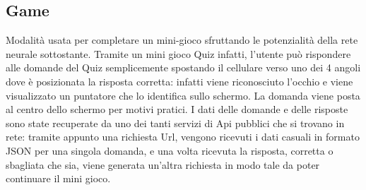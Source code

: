 \documentclass[11pt]{article}
\begin{document}
\newpage
\subsection{Game}
\label{sub:game}
Modalità usata per completare un mini-gioco sfruttando le potenzialità della rete neurale sottostante. Tramite un mini gioco Quiz infatti, l'utente può rispondere alle domande del Quiz semplicemente spostando il cellulare verso uno dei 4 angoli dove è posizionata la risposta corretta: infatti viene riconosciuto l'occhio e viene visualizzato un puntatore che lo identifica sullo schermo. La domanda viene posta al centro dello schermo per motivi pratici.
\newline
I dati delle domande e delle risposte sono state recuperate da uno dei tanti servizi di Api pubblici che si trovano in rete: tramite appunto una richiesta Url, vengono ricevuti i dati casuali in formato JSON per una singola domanda, e una volta ricevuta la risposta, corretta o sbagliata che sia, viene generata un'altra richiesta in modo tale da poter continuare il mini gioco. 
\end{document}
